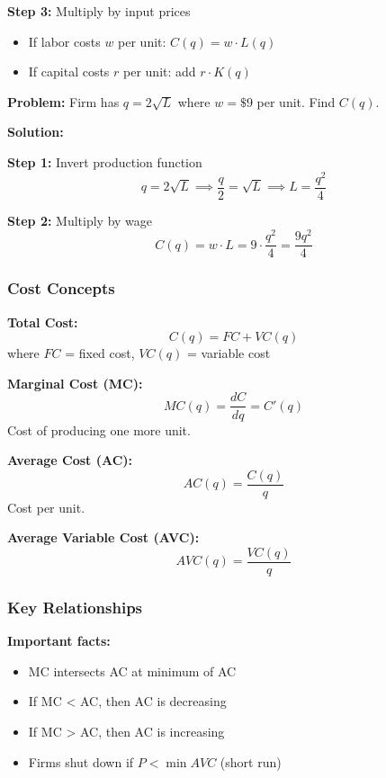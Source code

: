 \documentclass[10pt,letterpaper]{article}
\begin{document}
\textbf{Step 3:} Multiply by input prices
\begin{itemize}
  \item If labor costs $w$ per unit: $C(q) = w \cdot L(q)$
  \item If capital costs $r$ per unit: add $r \cdot K(q)$
\end{itemize}

\begin{examplebox}
\textbf{Problem:} Firm has $q = 2\sqrt{L}$ where $w = \$9$ per unit. Find $C(q)$.

\textbf{Solution:}

\textbf{Step 1:} Invert production function
\[
q = 2\sqrt{L} \implies \frac{q}{2} = \sqrt{L} \implies L = \frac{q^2}{4}
\]

\textbf{Step 2:} Multiply by wage
\[
C(q) = w \cdot L = 9 \cdot \frac{q^2}{4} = \boxed{\frac{9q^2}{4}}
\]
\end{examplebox}

\subsubsection{Cost Concepts}

\begin{formulabox}
\textbf{Total Cost:}
\[
C(q) = FC + VC(q)
\]
where $FC$ = fixed cost, $VC(q)$ = variable cost

\textbf{Marginal Cost (MC):}
\[
\boxed{MC(q) = \frac{dC}{dq} = C'(q)}
\]
Cost of producing one more unit.

\textbf{Average Cost (AC):}
\[
\boxed{AC(q) = \frac{C(q)}{q}}
\]
Cost per unit.

\textbf{Average Variable Cost (AVC):}
\[
\boxed{AVC(q) = \frac{VC(q)}{q}}
\]
\end{formulabox}

\subsubsection{Key Relationships}

\begin{tcolorbox}[colback=blue!5,colframe=blue!70]
\textbf{Important facts:}
\begin{itemize}
  \item MC intersects AC at minimum of AC
  \item If MC < AC, then AC is decreasing
  \item If MC > AC, then AC is increasing
  \item Firms shut down if $P < \min AVC$ (short run)
\end{itemize}
\end{tcolorbox}
\end{document}
